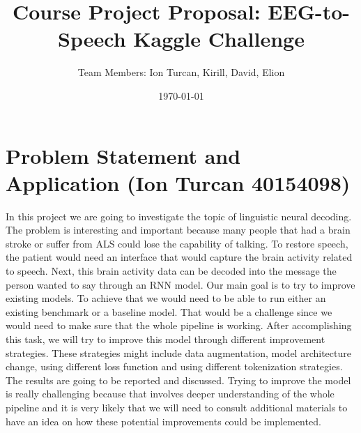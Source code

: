 \documentclass[12pt,a4paper]{article}
\title{Course Project Proposal: EEG-to-Speech Kaggle Challenge}
\author{Team Members: Ion Turcan, Kirill, David, Elion}
\date{\today}
\begin{document}
\maketitle

\section{Problem Statement and Application (Ion Turcan 40154098)}
In this project we are going to investigate the topic of linguistic neural decoding.
The problem is interesting and important because many people that had a brain stroke or suffer from ALS could lose the capability of talking.
To restore speech, the patient would need an interface that would capture the brain activity related to speech.
Next, this brain activity data can be decoded into the message the person wanted to say through an RNN model.
Our main goal is to try to improve existing models.
To achieve that we would need to be able to run either an existing benchmark or a baseline model.
That would be a challenge since we would need to make sure that the whole pipeline is working.
After accomplishing this task, we will try to improve this model through different improvement strategies.
These strategies might include data augmentation, model architecture change, using different loss function and using different tokenization strategies.
The results are going to be reported and discussed.
Trying to improve the model is really challenging because that involves deeper understanding of the whole pipeline and it is very likely that we will need to consult additional materials to have an idea on how these potential improvements could be implemented.
\end{document}
